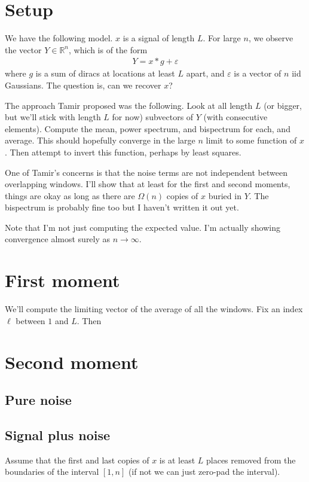 \documentclass{article}
\theoremstyle{thm}
\theoremstyle{definition}
\newcommand{\ep}{\varepsilon}
\begin{document}
\section{Setup}

We have the following model. $x$ is a signal of length $L$. For large $n$, we observe the vector $Y \in \mathbb{R}^n$, which is of the form 
%
\begin{align}
%
    Y = x \ast g + \ep
%
\end{align}
%
where $g$ is a sum of diracs at locations at least $L$ apart, and $\ep$ is a vector of $n$ iid Gaussians. The question is, can we recover $x$? 

The approach Tamir proposed was the following. Look at all length $L$ (or bigger, but we'll stick with length $L$ for now) subvectors of $Y$ (with consecutive elements). Compute the mean, power spectrum, and bispectrum for each, and average. This should hopefully converge in the large $n$ limit to some function of $x$. Then attempt to invert this function, perhaps by least squares.

One of Tamir's concerns is that the noise terms are not independent between overlapping windows. I'll show that at least for the first and second moments, things are okay as long as there are $\Omega(n)$ copies of $x$ buried in $Y$. The bispectrum is probably fine too but I haven't written it out yet.

Note that I'm not just computing the expected value. I'm actually showing convergence almost surely as $n \to \infty$.


\section{First moment}

We'll compute the limiting vector of the average of all the windows. Fix an index $\ell$ between $1$ and $L$. Then 

\section{Second moment}

\subsection{Pure noise}



\subsection{Signal plus noise}




Assume that the first and last copies of $x$ is at least $L$ places removed from the boundaries of the interval $[1,n]$ (if not we can just zero-pad the interval).
\end{document}
